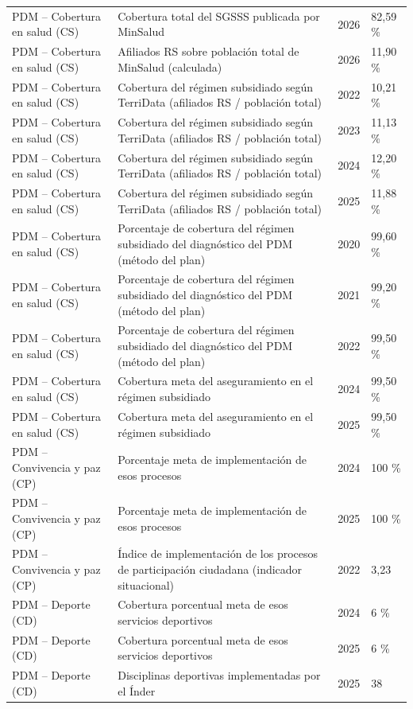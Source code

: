 \documentclass[11pt,letterpaper]{article}
\begin{document}
{\begin{xltabular}{\linewidth}{L{4cm}YL{1.6cm}L{2.6cm}}
PDM -- Cobertura en salud (CS) & Cobertura total del SGSSS publicada por MinSalud & 2026 & 82,59 \% \\
PDM -- Cobertura en salud (CS) & Afiliados RS sobre población total de MinSalud (calculada) & 2026 & 11,90 \% \\
PDM -- Cobertura en salud (CS) & Cobertura del régimen subsidiado según TerriData (afiliados RS / población total) & 2022 & 10,21 \% \\
PDM -- Cobertura en salud (CS) & Cobertura del régimen subsidiado según TerriData (afiliados RS / población total) & 2023 & 11,13 \% \\
PDM -- Cobertura en salud (CS) & Cobertura del régimen subsidiado según TerriData (afiliados RS / población total) & 2024 & 12,20 \% \\
PDM -- Cobertura en salud (CS) & Cobertura del régimen subsidiado según TerriData (afiliados RS / población total) & 2025 & 11,88 \% \\
PDM -- Cobertura en salud (CS) & Porcentaje de cobertura del régimen subsidiado del diagnóstico del PDM (método del plan) & 2020 & 99,60 \% \\
PDM -- Cobertura en salud (CS) & Porcentaje de cobertura del régimen subsidiado del diagnóstico del PDM (método del plan) & 2021 & 99,20 \% \\
PDM -- Cobertura en salud (CS) & Porcentaje de cobertura del régimen subsidiado del diagnóstico del PDM (método del plan) & 2022 & 99,50 \% \\
PDM -- Cobertura en salud (CS) & Cobertura meta del aseguramiento en el régimen subsidiado & 2024 & 99,50 \% \\
PDM -- Cobertura en salud (CS) & Cobertura meta del aseguramiento en el régimen subsidiado & 2025 & 99,50 \% \\
PDM -- Convivencia y paz (CP) & Porcentaje meta de implementación de esos procesos & 2024 & 100 \% \\
PDM -- Convivencia y paz (CP) & Porcentaje meta de implementación de esos procesos & 2025 & 100 \% \\
PDM -- Convivencia y paz (CP) & Índice de implementación de los procesos de participación ciudadana (indicador situacional) & 2022 & 3,23 \\
PDM -- Deporte (CD) & Cobertura porcentual meta de esos servicios deportivos & 2024 & 6 \% \\
PDM -- Deporte (CD) & Cobertura porcentual meta de esos servicios deportivos & 2025 & 6 \% \\
PDM -- Deporte (CD) & Disciplinas deportivas implementadas por el Índer & 2025 & 38 \\

\end{xltabular}}
\end{document}
